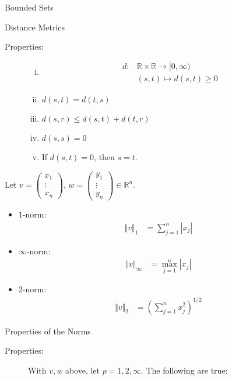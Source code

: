 \documentclass[10pt]{extarticle}
\newcommand{\R}{\mathbb{R}}
\begin{document}
\begin{problem}{Bounded Sets}
\begin{problem}{Distance Metrics}
      \begin{description}
        \item[Properties:]\hfill
          \begin{enumerate}[(i)]
            \item 
            \begin{align*}
              d: &\R \times \R \rightarrow [0,\infty)\\
                 &(s,t) \mapsto d(s,t) \geq 0
            \end{align*}
            \item $d(s,t) = d(t,s)$
            \item $d(s,r) \leq d(s,t) + d(t,r)$
            \item $d(s,s) = 0$
            \item If $d(s,t) = 0$, then $s = t$.
          \end{enumerate}
      \end{description}
      Let $v = \begin{pmatrix}x_1\\\vdots\\x_n\end{pmatrix}$, $ w = \begin{pmatrix}y_1\\\vdots\\y_n\end{pmatrix} \in \R^n$.
      \begin{itemize}
        \item  $1$-norm:
          \begin{align*}
            \Vert v \Vert_1 &= \sum_{j = 1}^{n} |x_j|
          \end{align*}
        \item $\infty$-norm:
          \begin{align*}
            \Vert v \Vert_{\infty} &= \max_{j=1}^{n} |x_j|
          \end{align*}
        \item $2$-norm:
          \begin{align*}
            \Vert v \Vert_2 &= \left(\sum_{j = 1}^{n} x_j^2\right)^{1/2}
          \end{align*}
      \end{itemize}
    \end{problem}
    \begin{problem}{Properties of the Norms}
      \begin{description}
        \item[Properties:] With $v,w$  above, let $p = 1,2,\infty$. The following are true:

\end{description}
\end{problem}
\end{problem}
\end{document}
